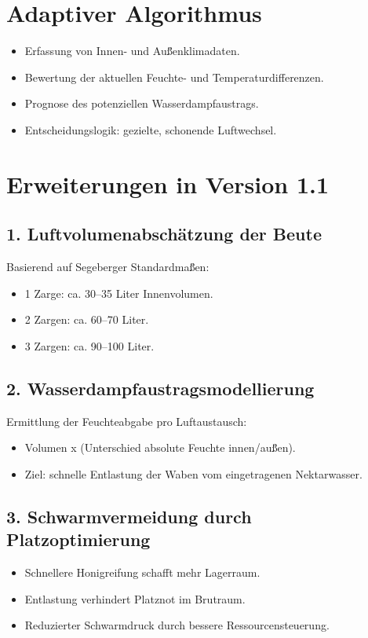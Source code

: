 \documentclass[11pt,a4paper]{article}
\begin{document}
\section{Adaptiver Algorithmus}
\begin{itemize}[topsep=2pt]
  \item Erfassung von Innen- und Au\u{\ss}enklimadaten.
  \item Bewertung der aktuellen Feuchte- und Temperaturdifferenzen.
  \item Prognose des potenziellen Wasserdampfaustrags.
  \item Entscheidungslogik: gezielte, schonende Luftwechsel.
\end{itemize}

\section{Erweiterungen in Version 1.1}

\subsection{1. Luftvolumenabsch\"atzung der Beute}
Basierend auf Segeberger Standardma\u{\ss}en:
\begin{itemize}[topsep=2pt]
  \item 1 Zarge: ca. 30--35 Liter Innenvolumen.
  \item 2 Zargen: ca. 60--70 Liter.
  \item 3 Zargen: ca. 90--100 Liter.
\end{itemize}

\subsection{2. Wasserdampfaustragsmodellierung}
Ermittlung der Feuchteabgabe pro Luftaustausch:
\begin{itemize}[topsep=2pt]
  \item Volumen x (Unterschied absolute Feuchte innen/au\u{\ss}en).
  \item Ziel: schnelle Entlastung der Waben vom eingetragenen Nektarwasser.
\end{itemize}

\subsection{3. Schwarmvermeidung durch Platzoptimierung}
\begin{itemize}[topsep=2pt]
  \item Schnellere Honigreifung schafft mehr Lagerraum.
  \item Entlastung verhindert Platznot im Brutraum.
  \item Reduzierter Schwarmdruck durch bessere Ressourcensteuerung.
\end{itemize}
\end{document}
